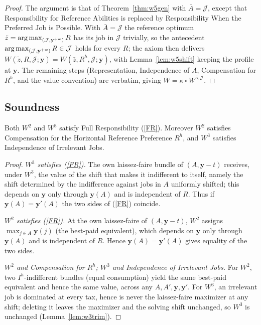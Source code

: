 \begin{proof}
The argument is that of Theorem~\ref{thm:w5gen} with $\bar A=\mathcal J$, except
that Responsibility for Reference Abilities is replaced by Responsibility When
the Preferred Job is Possible. With $\bar A=\mathcal J$ the reference optimum
$\tilde z=\operatorname*{arg\,max}_{(\mathcal J,\mathbf y^{+w})}R$ has its job in $\mathcal J$
trivially, so the antecedent $\operatorname*{arg\,max}_{(\mathcal J,\mathbf y^{+w})}R\in\mathcal
J$ holds for every $R$; the axiom then delivers
$W(\tilde z,R,\mathcal J;\mathbf y)=W(\bar z,R^h,\mathcal J;\mathbf y)$, with
Lemma~\ref{lem:w5shift} keeping the profile at $\mathbf y$. The remaining steps
(Representation, Independence of $A$, Compensation for $R^h$, and the value
convention) are verbatim, giving $W=\kappa\circ W^{5,\mathcal J}$.
\end{proof}


\subsection{Soundness}

\begin{proposition}
\label{prop:fr_sound}
Both $W^2$ and $W^3$ satisfy Full Responsibility (\ref{FR}). Moreover $W^2$
satisfies Compensation for the Horizontal Reference Preference $R^h$, and $W^3$
satisfies Independence of Irrelevant Jobs.
\end{proposition}

\begin{proof}
\emph{$W^3$ satisfies (\ref{FR}).} The own laissez-faire bundle of
$(A,\mathbf y-t)$ receives, under $W^3$, the value of the shift that makes it
indifferent to itself, namely the shift determined by the indifference against
jobs in $A$ uniformly shifted; this depends on $\mathbf y$ only through
$\mathbf y(A)$ and is independent of $R$. Thus if $\mathbf y(A)=\mathbf y'(A)$
the two sides of (\ref{FR}) coincide.

\emph{$W^2$ satisfies (\ref{FR}).} At the own laissez-faire of
$(A,\mathbf y-t)$, $W^2$ assigns $\max_{j\in A}\mathbf y(j)$ (the best-paid
equivalent), which depends on $\mathbf y$ only through $\mathbf y(A)$ and is
independent of $R$. Hence $\mathbf y(A)=\mathbf y'(A)$ gives equality of the two
sides.

\emph{$W^2$ and Compensation for $R^h$; $W^3$ and Independence of Irrelevant
Jobs.} For $W^2$, two $I^h$-indifferent bundles (equal consumption) yield the
same best-paid equivalent and hence the same value, across any $A,A',\mathbf
y,\mathbf y'$. For $W^3$, an irrelevant job is dominated at every tax, hence is
never the laissez-faire maximizer at any shift; deleting it leaves the maximizer
and the solving shift unchanged, so $W^3$ is unchanged
(Lemma~\ref{lem:w3trim}).
\end{proof}

